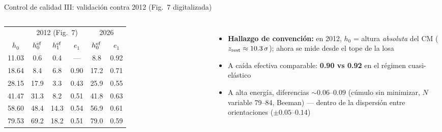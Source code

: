 \documentclass[11pt,aspectratio=169]{beamer}
\begin{document}
\begin{frame}{Control de calidad III: validación contra 2012 (Fig.~7 digitalizada)}
\begin{columns}[T]
\small
\begin{tabular}{c|ccc|cc}
\toprule
 & \multicolumn{3}{c|}{2012 (Fig.~7)} & \multicolumn{2}{c}{2026} \\
$h_0$ & $h_0^{\rm ef}$ & $h_1^{\rm ef}$ & $e_1$ & $h_0^{\rm ef}$ & $e_1$ \\
\midrule
11.03 &  0.6 &  0.4 & ---  &  8.8 & 0.92 \\
18.64 &  8.4 &  6.8 & 0.90 & 17.2 & 0.71 \\
28.15 & 17.9 &  3.3 & 0.43 & 25.9 & 0.55 \\
41.47 & 31.3 &  8.2 & 0.51 & 41.8 & 0.63 \\
58.60 & 48.4 & 14.3 & 0.54 & 56.9 & 0.61 \\
79.53 & 69.2 & 18.2 & 0.51 & 79.0 & 0.59 \\
\bottomrule
\end{tabular}
\begin{itemize}
    \item \textbf{Hallazgo de convención:} en 2012, $h_0$ = altura
    \emph{absoluta} del CM ($z_{\rm rest}\approx10.3\,\sigma$);
    ahora se mide desde el tope de la losa
    \item A caída efectiva comparable: \textbf{0.90 vs 0.92} en el
    régimen cuasi-elástico
    \item A alta energía, diferencias $\sim0.06$--$0.09$ (cúmulo sin
    minimizar, $N$ variable 79--84, Beeman) --- dentro de la dispersión
    entre orientaciones ($\pm0.05$--$0.14$)
\end{itemize}
\end{columns}
\end{frame}
\end{document}
